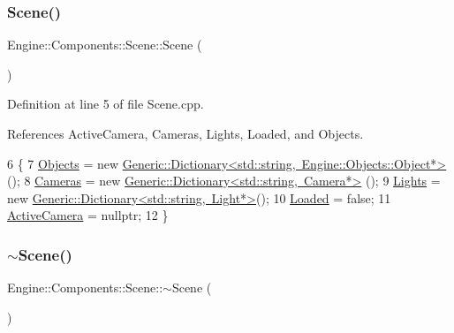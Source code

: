 \subsubsection{\texorpdfstring{Scene()}{Scene()}}
{\footnotesize\ttfamily Engine\+::\+Components\+::\+Scene\+::\+Scene (\begin{DoxyParamCaption}{ }\end{DoxyParamCaption})}



Definition at line 5 of file Scene.\+cpp.



References Active\+Camera, Cameras, Lights, Loaded, and Objects.


\begin{DoxyCode}
6 \{
7     \mbox{\hyperlink{classEngine_1_1Components_1_1Scene_a23481feabaaa56bf5613765db03af4da}{Objects}} = \textcolor{keyword}{new} 
      \mbox{\hyperlink{classGeneric_1_1Dictionary}{Generic::Dictionary<std::string, Engine::Objects::Object*>}}
      ();
8     \mbox{\hyperlink{classEngine_1_1Components_1_1Scene_aea98ff1ced88ee859878b504e9a2a362}{Cameras}} = \textcolor{keyword}{new} \mbox{\hyperlink{classGeneric_1_1Dictionary}{Generic::Dictionary<std::string, Camera*>}}
      ();
9     \mbox{\hyperlink{classEngine_1_1Components_1_1Scene_a00f60de2f6c72242a7af0076a3b75e5e}{Lights}} = \textcolor{keyword}{new} \mbox{\hyperlink{classGeneric_1_1Dictionary}{Generic::Dictionary<std::string, Light*>}}();
10     \mbox{\hyperlink{classEngine_1_1Components_1_1Scene_ae828757eea5410550f6674421051a783}{Loaded}} = \textcolor{keyword}{false};
11     \mbox{\hyperlink{classEngine_1_1Components_1_1Scene_a9408befee37d89e2c001d25b9e4ed75a}{ActiveCamera}} = \textcolor{keyword}{nullptr};
12 \}
\end{DoxyCode}
\mbox{\label{classEngine_1_1Components_1_1Scene_a418538cc49eced3ac4901a4e31797594}} 
\subsubsection{\texorpdfstring{$\sim$\+Scene()}{~Scene()}}
{\footnotesize\ttfamily Engine\+::\+Components\+::\+Scene\+::$\sim$\+Scene (\begin{DoxyParamCaption}{ }\end{DoxyParamCaption})}



